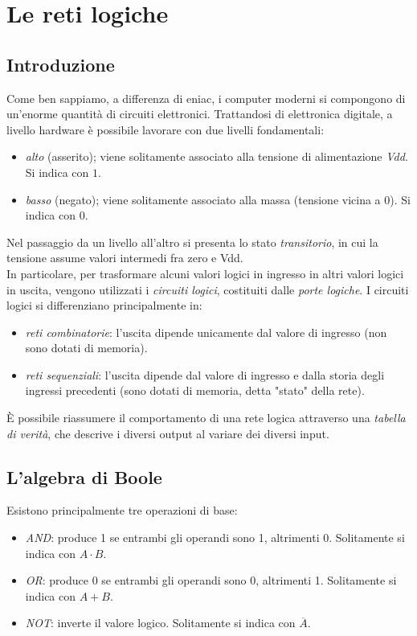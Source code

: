 \documentclass[class=book, crop=false, oneside]{standalone}
\begin{document}
\chapter{Le reti logiche}
\section{Introduzione}
Come ben sappiamo, a differenza di \acrshort{eniac}, i computer moderni si compongono di un'enorme quantità di circuiti elettronici. Trattandosi di elettronica digitale, a livello hardware è possibile lavorare con due livelli fondamentali:
\begin{itemize}
	\item \emph{alto} (asserito); viene solitamente associato alla tensione di alimentazione \emph{Vdd}. Si indica con \(1\).
	\item \emph{basso} (negato); viene solitamente associato alla massa (tensione vicina a 0). Si indica con \(0\).
\end{itemize}
Nel passaggio da un livello all'altro si presenta lo stato \emph{transitorio}, in cui la tensione assume valori intermedi fra zero e Vdd.\\
In particolare, per trasformare alcuni valori logici in ingresso in altri valori logici in uscita, vengono utilizzati i \emph{circuiti logici}, costituiti dalle \emph{porte logiche}. I circuiti logici si differenziano principalmente in:
\begin{itemize}
	\item \emph{reti combinatorie}: l'uscita dipende unicamente dal valore di ingresso (non sono dotati di memoria).
	\item \emph{reti sequenziali}: l'uscita dipende dal valore di ingresso e dalla storia degli ingressi precedenti (sono dotati di memoria, detta "stato" della rete).
\end{itemize}
\`{E} possibile riassumere il comportamento di una rete logica attraverso una \emph{tabella di verità}, che descrive i diversi output al variare dei diversi input.

\section{L'algebra di Boole}
Esistono principalmente tre operazioni di base:
\begin{itemize}
	\item \emph{AND}: produce 1 se entrambi gli operandi sono 1, altrimenti 0. Solitamente si indica con \(A\cdot B\).
	\item \emph{OR}: produce 0 se entrambi gli operandi sono 0, altrimenti 1. Solitamente si indica con \(A+B\).
	\item \emph{NOT}: inverte il valore logico. Solitamente si indica con \(\overline{A}\).
\end{itemize}
\end{document}
